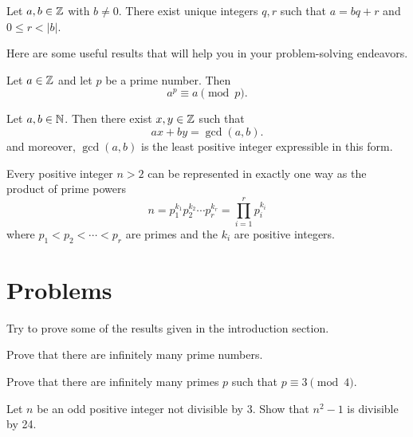 \documentclass{article}
\begin{document}
    \begin{theorem}
    Let $a, b\in \mathbb{Z}$ with $b\neq 0$. There exist unique integers $q,r$ such that $a=bq+r$ and $0 \leq r < |b|$.
    \end{theorem}

    Here are some useful results that will help you in your problem-solving endeavors.

    \begin{theorem}
        Let \(a\in\mathbb{Z}\) and let \(p\) be a prime number. 
        Then
        \[a^p\equiv a\pmod{p}.\]
    \end{theorem}

    \begin{theorem}
        Let \(a,b\in\mathbb{N}\). 
        Then there exist \(x,y\in\mathbb{Z}\) such that
        \[ax+by=\gcd(a,b).\]
        and moreover, $\gcd(a,b)$ is the least positive integer expressible in this form.
    \end{theorem}
    
    \begin{theorem}
    Every positive integer $n>2$ can be represented in exactly one way as the product of prime powers
    \[n=p_1^{k_1}p_2^{k_2}\cdots p_r^{k_r}=\prod_{i=1}^r p_i^{k_i}\] where $p_1<p_2<\cdots<p_r$ are primes and the $k_i$ are positive integers.
    \end{theorem}

\section{Problems}

    Try to prove some of the results given in the introduction section.

    \begin{exercise}
        Prove that there are infinitely many prime numbers.
    \end{exercise}

    \begin{exercise}
        Prove that there are infinitely many primes \(p\) such that \(p\equiv 3\pmod{4}\).
    \end{exercise}

    \begin{exercise}
        Let \(n\) be an odd positive integer not divisible by 3. Show that \(n^2-1\) is divisible by 24.
    \end{exercise}
\end{document}
